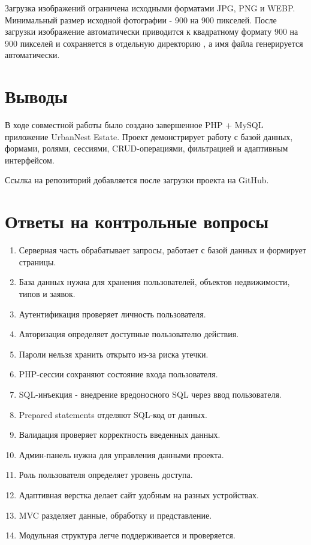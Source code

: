 \documentclass[12pt,a4paper]{article}
\begin{document}
Загрузка изображений ограничена исходными форматами JPG, PNG и WEBP. Минимальный размер исходной фотографии - 900 на 900 пикселей. После загрузки изображение автоматически приводится к квадратному формату 900 на 900 пикселей и сохраняется в отдельную директорию , а имя файла генерируется автоматически.

\section{Выводы}

В ходе совместной работы было создано завершенное PHP + MySQL приложение UrbanNest Estate. Проект демонстрирует работу с базой данных, формами, ролями, сессиями, CRUD-операциями, фильтрацией и адаптивным интерфейсом.

Ссылка на репозиторий добавляется после загрузки проекта на GitHub.

\section{Ответы на контрольные вопросы}

\begin{enumerate}
  \item Серверная часть обрабатывает запросы, работает с базой данных и формирует страницы.
  \item База данных нужна для хранения пользователей, объектов недвижимости, типов и заявок.
  \item Аутентификация проверяет личность пользователя.
  \item Авторизация определяет доступные пользователю действия.
  \item Пароли нельзя хранить открыто из-за риска утечки.
  \item PHP-сессии сохраняют состояние входа пользователя.
  \item SQL-инъекция - внедрение вредоносного SQL через ввод пользователя.
  \item Prepared statements отделяют SQL-код от данных.
  \item Валидация проверяет корректность введенных данных.
  \item Админ-панель нужна для управления данными проекта.
  \item Роль пользователя определяет уровень доступа.
  \item Адаптивная верстка делает сайт удобным на разных устройствах.
  \item MVC разделяет данные, обработку и представление.
  \item Модульная структура легче поддерживается и проверяется.
\end{enumerate}
\end{document}

